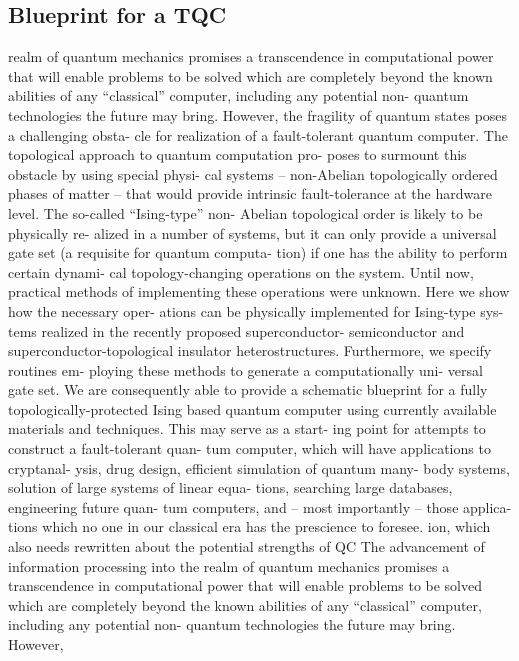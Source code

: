 \documentclass[preprint, 5p, 10pt]{elsarticle}
\theoremstyle{plain}
\begin{document}
\subsection{Blueprint for a TQC}%
realm of quantum mechanics promises a transcendence
in computational power that will enable problems to be
solved which are completely beyond the known abilities
of any “classical” computer, including any potential non-
quantum technologies the future may bring. However,
the fragility of quantum states poses a challenging obsta-
cle for realization of a fault-tolerant quantum computer.
The topological approach to quantum computation pro-
poses to surmount this obstacle by using special physi-
cal systems – non-Abelian topologically ordered phases
of matter – that would provide intrinsic fault-tolerance
at the hardware level. The so-called “Ising-type” non-
Abelian topological order is likely to be physically re-
alized in a number of systems, but it can only provide
a universal gate set (a requisite for quantum computa-
tion) if one has the ability to perform certain dynami-
cal topology-changing operations on the system. Until
now, practical methods of implementing these operations
were unknown. Here we show how the necessary oper-
ations can be physically implemented for Ising-type sys-
tems realized in the recently proposed superconductor-
semiconductor and superconductor-topological insulator
heterostructures. Furthermore, we specify routines em-
ploying these methods to generate a computationally uni-
versal gate set. We are consequently able to provide
a schematic blueprint for a fully topologically-protected
Ising based quantum computer using currently available
materials and techniques. This may serve as a start-
ing point for attempts to construct a fault-tolerant quan-
tum computer, which will have applications to cryptanal-
ysis, drug design, efficient simulation of quantum many-
body systems, solution of large systems of linear equa-
tions, searching large databases, engineering future quan-
tum computers, and – most importantly – those applica-
tions which no one in our classical era has the prescience
to foresee.
ion, which also needs rewritten about the potential strengths of QC
The advancement of information processing into the
realm of quantum mechanics promises a transcendence
in computational power that will enable problems to be
solved which are completely beyond the known abilities
of any “classical” computer, including any potential non-
quantum technologies the future may bring. However,
\end{document}
